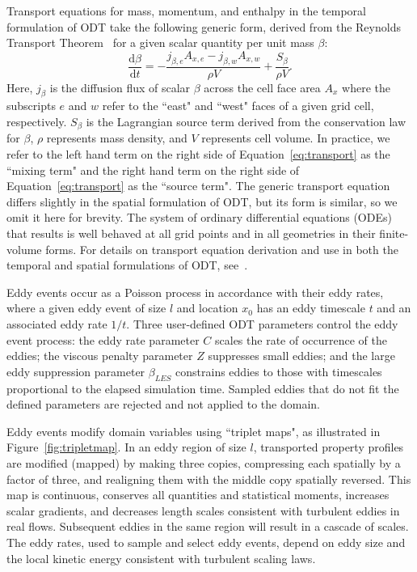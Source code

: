 \documentclass[preprint,12pt, a4paper]{elsarticle}
\begin{document}
Transport equations for mass, momentum, and enthalpy in the temporal formulation of ODT take the following generic form, derived from the Reynolds Transport Theorem~\cite{Cengel_2010} for a given scalar quantity per unit mass $\beta$: 
\begin{equation} 
\label{eq:transport}
	\frac{\mathrm{d}\beta}{\mathrm{d}t} = -\frac{j_{\beta,e}A_{x,e}-j_{\beta,w}A_{x,w}}{\rho V} + \frac{S_{\beta}}{\rho V}.
\end{equation}
Here, $j_{\beta}$ is the diffusion flux of scalar $\beta$ across the cell face area $A_x$ where the subscripts $e$ and $w$ refer to the ``east" and ``west" faces of a given grid cell, respectively. $S_{\beta}$ is the Lagrangian source term derived from the conservation law for $\beta$, $\rho$ represents mass density, and $V$ represents cell volume. In practice, we refer to the left hand term on the right side of Equation~\ref{eq:transport} as the ``mixing term" and the right hand term on the right side of Equation~\ref{eq:transport} as the ``source term". The generic transport equation differs slightly in the spatial formulation of ODT, but its form is similar, so we omit it here for brevity. The system of ordinary differential equations (ODEs) that results is well behaved at all grid points and in all geometries in their finite-volume forms. For details on transport equation derivation and use in both the temporal and spatial formulations of ODT, see~\cite{Lignell_2018}. 

Eddy events occur as a Poisson process in accordance with their eddy rates, where a given eddy event of size $l$ and location $x_0$ has an eddy timescale $t$ and an associated eddy rate $1/t$. Three user-defined ODT parameters control the eddy event process: the eddy rate parameter $C$ scales the rate of occurrence of the eddies; the viscous penalty parameter $Z$ suppresses small eddies; and the large eddy suppression parameter $\beta_{LES}$ constrains eddies to those with timescales proportional to the elapsed simulation time. Sampled eddies that do not fit the defined parameters are rejected and not applied to the domain.

Eddy events modify domain variables using ``triplet maps", as illustrated in Figure~\ref{fig:tripletmap}. In an eddy region of size $l$, transported property profiles are modified (mapped) by making three copies, compressing each spatially by a factor of three, and realigning them with the middle copy spatially reversed. This map is continuous, conserves all quantities and statistical moments, increases scalar gradients, and decreases length scales consistent with turbulent eddies in real flows. Subsequent eddies in the same region will result in a cascade of scales. The eddy rates, used to sample and select eddy events, depend on eddy size and the local kinetic energy consistent with turbulent scaling laws.  
\end{document}
